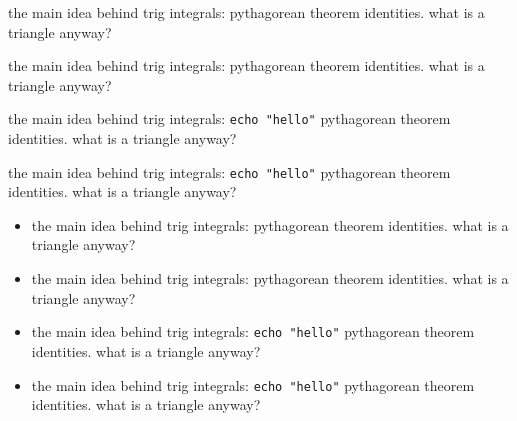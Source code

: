 \documentclass{article}
\begin{document}
the main idea behind trig integrals: pythagorean theorem identities. what is a triangle anyway?

the main idea behind trig integrals:
%
pythagorean theorem identities.
what is a triangle anyway?

the main idea behind trig integrals:
%
\texttt{echo "hello"}
pythagorean theorem identities.
what is a triangle anyway?

the main idea behind trig integrals:
%
\texttt{echo "hello"}
%
pythagorean theorem identities.
what is a triangle anyway?

\begin{itemize}

  \item the main idea behind trig integrals: pythagorean theorem identities. what is a triangle anyway?

  \item the main idea behind trig integrals:
    pythagorean theorem identities.
    what is a triangle anyway?

  \item the main idea behind trig integrals:
    \texttt{echo "hello"}
    pythagorean theorem identities.
    what is a triangle anyway?

  \item the main idea behind trig integrals:
    \texttt{echo "hello"}
    pythagorean theorem identities.
    what is a triangle anyway?


\end{itemize}
\end{document}
